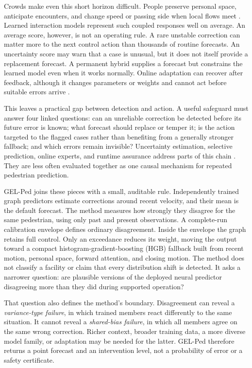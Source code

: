 \documentclass[preprint,11pt,authoryear]{elsarticle}
\begin{document}
Crowds make even this short horizon difficult. People preserve personal space, anticipate encounters, and change speed or passing side when local flows meet \citep{moussaid2011,karamouzas2014}. Learned interaction models represent such coupled responses well on average. An average score, however, is not an operating rule. A rare unstable correction can matter more to the next control action than thousands of routine forecasts. An uncertainty score may warn that a case is unusual, but it does not itself provide a replacement forecast. A permanent hybrid supplies a forecast but constrains the learned model even when it works normally. Online adaptation can recover after feedback, although it changes parameters or weights and cannot act before suitable errors arrive \citep{ivanovic2023adaptive,park2024t4p}.

This leaves a practical gap between detection and action. A useful safeguard must answer four linked questions: can an unreliable correction be detected before its future error is known; what forecast should replace or temper it; is the action targeted to the flagged cases rather than benefiting from a generally stronger fallback; and which errors remain invisible? Uncertainty estimation, selective prediction, online experts, and runtime assurance address parts of this chain \citep{ovadia2019uncertainty,malinin2021shifts,geifman2017selective,sha2001simplicity}. They are less often evaluated together as one causal mechanism for repeated pedestrian prediction.

GEL-Ped joins these pieces with a small, auditable rule. Independently trained graph predictors estimate corrections around recent velocity, and their mean is the default forecast. The method measures how strongly they disagree for the same pedestrian, using only past and present observations. A complete-run calibration envelope defines ordinary disagreement. Inside the envelope the graph retains full control. Only an exceedance reduces its weight, moving the output toward a compact histogram-gradient-boosting (HGB) fallback built from recent motion, personal space, forward attention, and closing motion. The method does not classify a facility or claim that every distribution shift is detected. It asks a narrower question: are plausible versions of the deployed neural predictor disagreeing more than they did during supported operation?

That question also defines the method's boundary. Disagreement can reveal a \emph{variance-type failure}, in which trained members react differently to the same situation. It cannot reveal a \emph{shared-bias failure}, in which all members agree on the same wrong correction. Richer context, broader training data, a more diverse model family, or adaptation may be needed for the latter. GEL-Ped therefore returns a point forecast and an intervention level, not a probability of error or a safety certificate.
\end{document}

